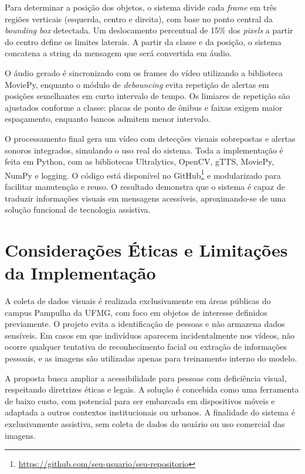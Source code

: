 Para determinar a posição dos objetos, o sistema divide cada \textit{frame} em três regiões verticais (esquerda, centro e direita), com base no ponto central da \textit{bounding box} detectada. Um deslocamento percentual de 15\% dos \textit{pixels} a partir do centro define os limites laterais. A partir da classe e da posição, o sistema concatena a string da mensagem que será convertida em áudio.

O áudio gerado é sincronizado com os frames do vídeo utilizando a biblioteca MoviePy, enquanto o módulo de \textit{debouncing} evita repetição de alertas em posições semelhantes em curto intervalo de tempo. Os limiares de repetição são ajustados conforme a classe: placas de ponto de ônibus e faixas exigem maior espaçamento, enquanto bancos admitem menor intervalo.

O processamento final gera um vídeo com detecções visuais sobrepostas e alertas sonoros integrados, simulando o uso real do sistema. Toda a implementação é feita em Python, com as bibliotecas Ultralytics, OpenCV, gTTS, MoviePy, NumPy e logging. O código está disponível no GitHub\footnote{\url{https://github.com/seu-usuario/seu-repositorio}} e modularizado para facilitar manutenção e reuso. O resultado demonstra que o sistema é capaz de traduzir informações visuais em mensagens acessíveis, aproximando-se de uma solução funcional de tecnologia assistiva.

\section{Considerações Éticas e Limitações da Implementação}

A coleta de dados visuais é realizada exclusivamente em áreas públicas do campus Pampulha da UFMG, com foco em objetos de interesse definidos previamente. O projeto evita a identificação de pessoas e não armazena dados sensíveis. Em casos em que indivíduos aparecem incidentalmente nos vídeos, não ocorre qualquer tentativa de reconhecimento facial ou extração de informações pessoais, e as imagens são utilizadas apenas para treinamento interno do modelo.

A proposta busca ampliar a acessibilidade para pessoas com deficiência visual, respeitando diretrizes éticas e legais. A solução é concebida como uma ferramenta de baixo custo, com potencial para ser embarcada em dispositivos móveis e adaptada a outros contextos institucionais ou urbanos. A finalidade do sistema é exclusivamente assistiva, sem coleta de dados do usuário ou uso comercial das imagens.


